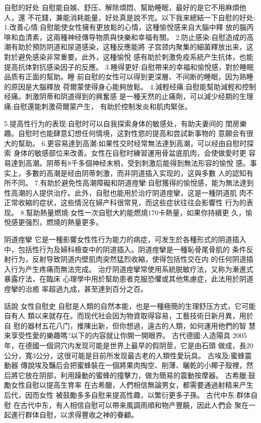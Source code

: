\documentclass[12pt,UTF8]{ctexbook}
\begin{document}
自慰的好处
自慰能自娛、舒压、解除煩悶、幫助睡眠，最好的是它不用麻煩他人，還
不花錢，兼能消耗能量，好处真是說不完。以下我来總結一下自慰的好处:
1.改善心情:自慰能使女性擁有更放鬆的心情，这種愉悅感来自大腦中釋
放的腦丙啡和血清素，这兩種神经傳导物质與快樂和幸福有關。
2.防止感染:自慰造成的高潮有助於預防阴道和尿道感染，这種反應能將
子宫颈内聚集的細菌釋放出来，这對於避免感染非常重要。此外，这種愉悅
感有助於刺激免疫系統产生抗体，也能提高抗体對抗感染因子的反應。
3.睡得更好:自慰帶来的幸福和愉悅感，對於睡眠品质有正面的幫助。睡
前自慰的女性可以得到更深層、不间断的睡眠，因为熟睡的原因是大腦釋放
荷爾蒙使得身心能夠放鬆。
4.減輕经痛:自慰能幫助減輕和控制经痛。刺激阴蒂和阴道得到的興奮感
是一種天然的止痛劑，可以減少经期的生理痛;自慰還能刺激荷爾蒙产生，
有助於控制发炎和肌肉緊张。

5.提高性行为的表现:自慰时可以自我探索身体的敏感处，有助夫妻间的
閨房樂趣。自慰时也能肆意幻想任何情境，这對性慾的提高和尝試新事物的
意願会有很大的幫助。
6.更容易達到高潮:如果性交时经常無法達到高潮，可以经由自慰时探索
身体的敏感部位来改善。女性在自慰时練習運用骨盆底肌肉，会使做愛时更
容易達到高潮。阴蒂有8千多個神经末梢，受到刺激后能得到無法形容的愉悅
感。事实上，多數的高潮是经由阴蒂刺激，而非阴道插入实现的，这與多數
人的認知有所不同。
7.有助於避免性高潮障礙和阴道痙攣:自慰獲得的愉悅感，能为無法達到
性高潮的人提供治疗。此外，自慰也能用於治疗阴道痙攣，这是一種阴道肌
肉不正常收縮的症状，这些情況在婦产科很常見，而这些症状往往会影響性
行为的表现。
8.幫助熱量燃燒:女性一次自慰大約能燃燒170卡熱量，如果你持續更
久，愉悅感更强烈，燃燒的熱量更多。

阴道痙攣
它是一種影響女性性行为能力的病症，可发生於各種形式的阴道插入
中，包括性行为及婦科檢查中的阴道插入。阴道痙攣是一種恥骨尾骨肌的
条件反射行为，反射导致阴道内壁肌肉突然猛烈收縮，使得包括性交在内
的任何阴道插入行为产生疼痛而無法完成。
治疗阴道痙攣常使用系統脱敏疗法，又称为漸進式暴露疗法，在臨床
心理學中用於幫助患者克服恐懼或其他焦慮症，此法用於阴道痙攣的治癒
率超過九成，甚至達到百分之百。

話說
女性自慰史
自慰是人類的自然本能，也是一種極簡的生理舒压方式，它可能自有人
類以来就存在。而现代社会因为物資取得容易，工藝技術日新月異，用於自
慰的器材五花八门，推陳出新，但你想過，遠古的人類，如何運用他們的智
慧来享受性愛的樂趣嗎?以下的内容就让你開一開眼界。
古代德國:人造陽具
2005年，在德國一個洞穴内发现可能是世界上最早的假阴莖，它是由石頭
做成，長20公分，寬3公分，这很可能是目前所发现最古老的人類性愛玩具。
古埃及:蜜蜂震動器
傳說埃及豔后会把蜜蜂裝在一個將果肉掏空、削薄、曬乾的小椰子殼裡，然后將它放在阴部，利用躁動的蜜蜂的撞擊力，做为簡易的震動按摩器。
古希臘:鼓勵女性自慰以提高生育率
在古希臘，人們相信無論男女，都需要通過射精来产生后代，因而女性
被鼓勵多多自慰来提高性趣，以繁衍更多子孫。
古代中东:群体自慰
在古代中东，有人相信自慰可以帶来風調雨順和物产豐饒，因此人們会
聚在一起進行群体自慰，以求得豐收之神的眷顧。
\end{document}
